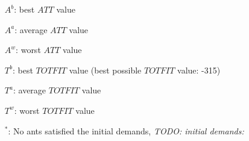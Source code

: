 \begin{table}
\begin{itemize}[noitemsep]
    \item[$A^b$:] best $ATT$ value
    \item[$A^a$:] average $ATT$ value
    \item[$A^w$:] worst $ATT$ value
    \item[$T^b$:] best $TOTFIT$ value (best possible $TOTFIT$ value: -315)
    \item[$T^a$:] average $TOTFIT$ value
    \item[$T^w$:] worst $TOTFIT$ value
    \item[$^*$:] No ants satisfied the initial demands, \emph{\color{blue} TODO: initial demands: }
    \end{itemize}
    \label{table:parameterSettings}
\end{table}


